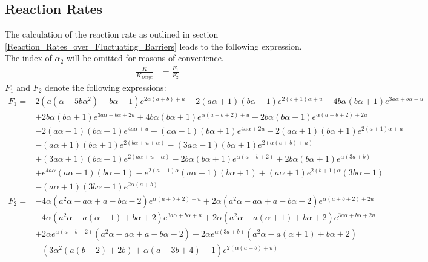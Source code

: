 \subsection{Reaction Rates}

The calculation of the reaction rate as outlined in section \ref{Reaction_Rates_over_Fluctuating_Barriers} leads to the following expression. The index of $\alpha_2$ will be omitted for reasons of convenience.
\begin{align}
    \frac{K}{K_{Debye}} &= \frac{F_1}{F_2}
    \label{two_state_rate}
\end{align}
$F_1$ and $F_2$ denote the following expressions:
\begin{align*}
    F_1 =& 2 \left(a \left(\alpha-5 b \alpha^2\right)+b \alpha-1\right) e^{2 \alpha (a+b)+u}-2 (a \alpha+1) (b \alpha-1) e^{2 (b+1) \alpha+u}-4 b \alpha (b \alpha+1) e^{3 a \alpha+b \alpha+u} \\
    &+2 b \alpha (b \alpha+1) e^{3 a \alpha+b \alpha+2 u}+4 b \alpha (b \alpha+1) e^{\alpha (a+b+2)+u}-2 b \alpha (b \alpha+1) e^{\alpha (a+b+2)+2 u} \\
    &-2 (a \alpha-1) (b \alpha+1) e^{4 a \alpha+u}+(a \alpha-1) (b \alpha+1) e^{4 a \alpha+2 u}-2 (a \alpha+1) (b \alpha+1) e^{2 (a+1) \alpha+u} \\
    &-(a \alpha+1) (b \alpha+1) e^{2 (b \alpha+u+\alpha)}-(3 a \alpha-1) (b \alpha+1) e^{2 (\alpha (a+b)+u)} \\
    &+(3 a \alpha+1) (b \alpha+1) e^{2 (a \alpha+u+\alpha)}-2 b \alpha (b \alpha+1) e^{\alpha (a+b+2)}+2 b \alpha (b \alpha+1) e^{\alpha (3 a+b)} \\
    &+e^{4 a \alpha} (a \alpha-1) (b \alpha+1)-e^{2 (a+1) \alpha} (a \alpha-1) (b \alpha+1)+(a \alpha+1) e^{2 (b+1) \alpha} (3 b \alpha-1) \\
    &-(a \alpha+1) (3 b \alpha-1) e^{2 \alpha (a+b)} \\
    F_2 =& -4 \alpha \left(a^2 \alpha-a \alpha+a-b \alpha-2\right) e^{\alpha (a+b+2)+u}+2 \alpha \left(a^2 \alpha-a \alpha+a-b \alpha-2\right) e^{\alpha (a+b+2)+2 u} \\
    &-4 \alpha \left(a^2 \alpha-a (\alpha+1)+b \alpha+2\right) e^{3 a \alpha+b \alpha+u}+2 \alpha \left(a^2 \alpha-a (\alpha+1)+b \alpha+2\right) e^{3 a \alpha+b \alpha+2 u} \\
    &+2 \alpha e^{\alpha (a+b+2)} \left(a^2 \alpha-a \alpha+a-b \alpha-2\right)+2 \alpha e^{\alpha (3 a+b)} \left(a^2 \alpha-a (\alpha+1)+b \alpha+2\right) \\
    &-\left(3 \alpha^2 (a (b-2)+2 b)+\alpha (a-3 b+4)-1\right) e^{2 (\alpha (a+b)+u)} \\

\end{align*}
